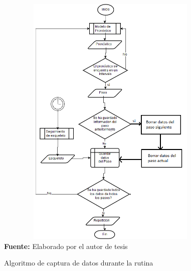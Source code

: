 \begin{figure}[H]
	\caption{Algoritmo de captura de datos durante la rutina}
	\label{fig:capturaDatos}
	\centering
	\includegraphics[width=430px,height=470px]{graphics/algoritmoDeteccion.png} \\
	\textbf{Fuente:} Elaborado por el autor de tesis
\end{figure}
